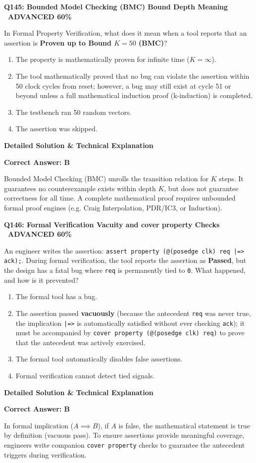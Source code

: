 \documentclass[11pt,a4paper]{article}
\newcommand{\badgeadv}{{\color{white}\colorbox{advred}{\bfseries\sffamily\tiny\ ADVANCED 60\%\ }}}
\newenvironment{qbox}[2]{%
  \begin{mdframed}[style=qstyle]%
  {\bfseries\sffamily\color{primaryblue}#1 \hfill #2}\par\vspace{2pt}%
}{%
  \end{mdframed}%
}
\newenvironment{ansbox}{%
  \begin{mdframed}[style=ansstyle]%
  {\bfseries\sffamily\color{ansgreen}\small Detailed Solution \& Technical Explanation}\par\vspace{2pt}\small%
}{%
  \end{mdframed}%
}
\begin{document}
\begin{qbox}{Q145: Bounded Model Checking (BMC) Bound Depth Meaning}{\badgeadv}
In Formal Property Verification, what does it mean when a tool reports that an assertion is \textbf{Proven up to Bound $K=50$ (BMC)}?
\begin{enumerate}[label=\textbf{\Alph*.}]
  \item The property is mathematically proven for infinite time ($K=\infty$).
  \item The tool mathematically proved that no bug can violate the assertion within 50 clock cycles from reset; however, a bug may still exist at cycle 51 or beyond unless a full mathematical induction proof (k-induction) is completed.
  \item The testbench ran 50 random vectors.
  \item The assertion was skipped.
\end{enumerate}
\end{qbox}
\begin{ansbox}
\textbf{Correct Answer: B}

Bounded Model Checking (BMC) unrolls the transition relation for $K$ steps. It guarantees no counterexample exists within depth $K$, but does not guarantee correctness for all time. A complete mathematical proof requires unbounded formal proof engines (e.g. Craig Interpolation, PDR/IC3, or Induction).
\end{ansbox}

\begin{qbox}{Q146: Formal Verification Vacuity and cover property Checks}{\badgeadv}
An engineer writes the assertion: \texttt{assert property (@(posedge clk) req |=> ack);}. During formal verification, the tool reports the assertion as \textbf{Passed}, but the design has a fatal bug where \texttt{req} is permanently tied to \texttt{0}. What happened, and how is it prevented?
\begin{enumerate}[label=\textbf{\Alph*.}]
  \item The formal tool has a bug.
  \item The assertion passed \textbf{vacuously} (because the antecedent \texttt{req} was never true, the implication \texttt{|=>} is automatically satisfied without ever checking \texttt{ack}); it must be accompanied by \texttt{cover property (@(posedge clk) req)} to prove that the antecedent was actively exercised.
  \item The formal tool automatically disables false assertions.
  \item Formal verification cannot detect tied signals.
\end{enumerate}
\end{qbox}
\begin{ansbox}
\textbf{Correct Answer: B}

In formal implication ($A \implies B$), if $A$ is false, the mathematical statement is true by definition (vacuous pass). To ensure assertions provide meaningful coverage, engineers write companion \texttt{cover property} checks to guarantee the antecedent triggers during verification.
\end{ansbox}
\end{document}
